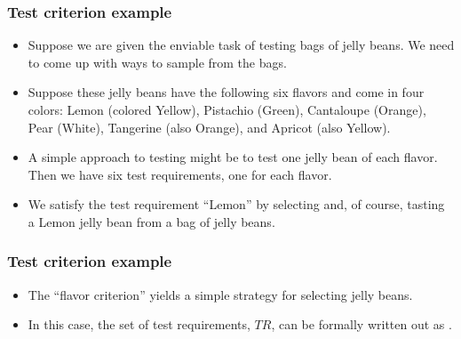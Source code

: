 \begin{frame}[hasprev=false, hasnext=true]
\label{example:test-criterion}
\frametitle{Test criterion example}

\begin{itemize}
	\item Suppose we are given the enviable task of testing bags of jelly beans.
	We need to come up with ways to sample from the bags.

	\item Suppose these jelly beans have the following six flavors and come in
	four colors: Lemon (colored Yellow), Pistachio (Green), Cantaloupe (Orange),
	Pear (White), Tangerine (also Orange), and Apricot (also Yellow).

	\item A simple approach to testing might be to test one jelly bean of each
	flavor. Then we have six test requirements, one for each flavor.

	\item We satisfy the test requirement ``Lemon'' by selecting and, of course,
	tasting a Lemon jelly bean from a bag of jelly beans.
\end{itemize}
\end{frame}


\begin{frame}[hasprev=true, hasnext=false]
\frametitle{Test criterion example}

\begin{itemize}
	\item The ``flavor criterion'' yields a simple strategy for selecting jelly
	beans.

	\item In this case, the set of test requirements, $TR$, can be formally
	written out as .
\end{itemize}
\end{frame}



